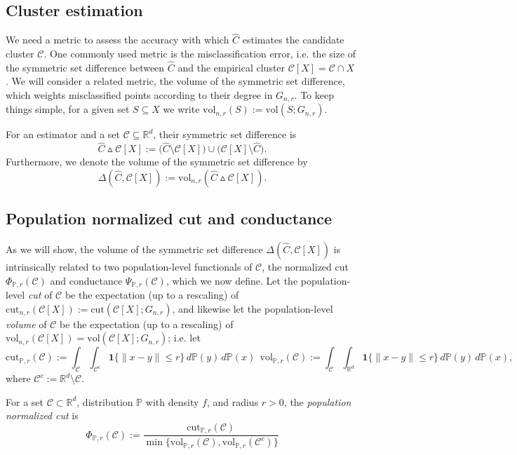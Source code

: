 \documentclass[11pt,twoside]{article}
\newcommand{\Reals}{\mathbb{R}}
\newcommand{\1}{\mathbf{1}}
\newcommand{\Rd}{\Reals^d}
\newcommand{\mc}[1]{\mathcal{#1}}
\newcommand{\Pbb}{\mathbb{P}}
\newcommand{\wh}[1]{\widehat{#1}}
\newcommand{\vol}{\mathrm{vol}}
\newcommand{\cut}{\mathrm{cut}}
\begin{document}
\subsection{Cluster estimation}
We need a metric to assess the accuracy with which $\wh{C}$ estimates the candidate cluster $\mc{C}$. One commonly used metric is the misclassification error, i.e. the size of the symmetric set difference
between $\wh{C}$ and the empirical cluster $\mc{C}[X] = \mc{C} \cap X$ \citep{korostelev1993,polonik1995,rigollet2009}. We
will consider a related metric, the volume of the symmetric set difference,
which weights misclassified points according to their degree in $G_{n,r}$. To keep things simple, for a given set $S \subseteq X$ we write $\vol_{n,r}(S) := \vol(S;G_{n,r})$. 
\begin{definition}
	\label{def:volume_symmetric_set_difference}
	For an estimator \smash{$\wh{C} \subseteq X$} and a set 
	$\mathcal{C} \subseteq \Rd$, their symmetric set difference is 
	\begin{equation*}
	\wh{C} \vartriangle \mathcal{C}[X] :=
	\bigl(\wh{C} \setminus \mathcal{C}[X]\bigr) \cup
	\bigl(\mathcal{C}[X] \setminus \wh{C}\bigr).
	\end{equation*}
	Furthermore, we denote the volume of the symmetric set difference by 
	$$
	\Delta(\wh{C}, \mathcal{C}[X]) := \vol_{n,r}(\wh{C} \vartriangle \mathcal{C}[X]). 
	$$
\end{definition}

\subsection{Population normalized cut and conductance}
As we will show, the volume of the symmetric set difference $\Delta(\wh{C},\mc{C}[X])$ is intrinsically related to two population-level functionals of $\mc{C}$, the normalized cut $\Phi_{\Pbb,r}(\mc{C})$ and conductance $\Psi_{\Pbb,r}(\mc{C})$, which we now define. Let the population-level \emph{cut} of $\mc{C}$ be the expectation (up to a rescaling) of $\cut_{n,r}(\mc{C}[X]) := \cut(\mc{C}[X]; G_{n,r})$,  and likewise let the population-level \emph{volume} of $\mc{C}$ be the expectation (up to a rescaling) of $\vol_{n,r}(\mc{C}[X]) = \vol(\mc{C}[X]; G_{n,r})$; i.e. let
\begin{equation*}
\mathrm{cut}_{\Pbb,r}(\mc{C}) := \int_{\mc{C}} \int_{\mc{C}^c} \1\{\|x - y\| \leq r\} \,d\Pbb(y) \,d\Pbb(x)~~ \mathrm{vol}_{\Pbb,r}(\mc{C}) := \int_{\mc{C}} \int_{\Rd} \1\{\|x - y\| \leq r\} \,d\Pbb(y) \,d\Pbb(x),
\end{equation*}
where $\mc{C}^c := \Rd \!\setminus\! \mc{C}$.
\begin{definition}
	For a set $\mc{C} \subset \Rd$, distribution $\Pbb$ with density $f$, and radius $r > 0$, the \emph{population normalized cut} is
	\begin{equation}
	\label{eqn:population_normalized_cut}
	\Phi_{\Pbb,r}(\mc{C}) := \frac{\mathrm{cut}_{\Pbb,r}(\mc{C})}{\min\{\mathrm{vol}_{\Pbb,r}(\mc{C}), \mathrm{vol}_{\Pbb,r}(\mc{C}^c)\}}
	\end{equation}
\end{definition}
\end{document}
